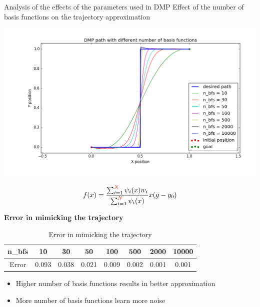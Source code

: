 \documentclass{beamer}
\begin{document}
	\begin{frame}{Analysis of the effects of the parameters used in DMP}
		Effect of the number of basis functions on the trajectory approximation
		\begin{center}
			\includegraphics[scale=0.25]{images/n_bfs_}
		\end{center}
		\begin{equation}
		f(x) = \frac{\sum_{i=1}^{\color{red}N\color{black}}\psi_{i}(x)w_{i}}{\sum_{i=1}^{\color{red}N\color{black}}\psi_{i}(x)}x(g - y_{0})
		\end{equation}
	\end{frame}
	
	\begin{frame}
		\textbf{Error in mimicking the trajectory}
		\begin{center}
			\begin{table}[H]
				
				\begin{tabular}{| c | c | c | c | c | c | c | c |}	
					\hline
					n\_bfs & 10 & 30 & 50 & 100 & 500 & 2000 & 10000\\       
					\hline
					Error & 0.093 & 0.038 & 0.021 & 0.009 & 0.002 & 0.001 & 0.001\\
					\hline
				\end{tabular}
				\caption{Error in mimicking the trajectory}
			\end{table}\label{_n_bfs_e}
		\end{center}
		\begin{itemize}
			\item Higher number of basis functions results in better approximation
			\item More number of basis functions learn more noise
		\end{itemize}
	\end{frame}
	
\end{document}
